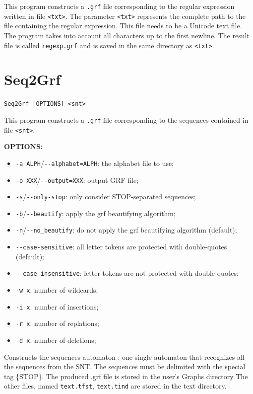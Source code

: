 \bigskip
\noindent {}This 
program constructs a \verb+.grf+ file corresponding to the regular
expression written in file \verb+<txt>+. The parameter \verb+<txt>+ represents the
complete path to the file containing the regular expression. This file needs to
be a Unicode text file. The program takes into account all characters up to the
first newline. The result file is called \verb+regexp.grf+ and is saved in the
same directory as \verb+<txt>+.





\section{Seq2Grf}
\label{Seq2Grf}
\verb+Seq2Grf [OPTIONS] <snt>+

\bigskip
\noindent This program constructs a \verb+.grf+ file 
corresponding to the sequences contained in file \verb+<snt>+. 

\bigskip
\noindent \textbf{OPTIONS:}

\begin{itemize}
  \item \verb+-a ALPH+/\verb+--alphabet=ALPH+: the alphabet file to use;
  \item \verb+-o XXX+/\verb+--output=XXX+: output GRF file;
  \item \verb+-s+/\verb+--only-stop+: only consider {STOP}-separated sequences;
  \item \verb+-b+/\verb+--beautify+: apply the grf beautifying algorithm;
  \item \verb+-n+/\verb+--no_beautify+: do not apply the grf beautifying algorithm (default);
  \item \verb+--case-sensitive+: all letter tokens are protected with double-quotes (default);
  \item \verb+--case-insensitive+: letter tokens are not protected with double-quotes;
  \item \verb+-w x+: number of wildcards;
  \item \verb+-i x+: number of insertions;
  \item \verb+-r x+: number of replations;
  \item \verb+-d x+: number of deletions;
\end{itemize}

\bigskip
\noindent Constructs the sequences automaton : one single automaton that recognizes
	all the sequences from the SNT.
	The sequences must be delimited with the special tag \{STOP\}.
	The produced .grf file is stored in the user's Graphs directory
	The other files, named \verb+text.tfst+, \verb+text.tind+ are stored in the text directory.

